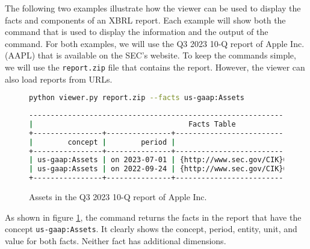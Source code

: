 The following two examples illustrate how the viewer can be used to display the facts and components of an XBRL report.
Each example will show both the command that is used to display the information and the output of the command.
For both examples, we will use the Q3 2023 10-Q report of Apple Inc. (AAPL) that is available on the SEC's website\cite{aapl_10q_2023_q3}.
To keep the commands simple, we will use the \texttt{report.zip} file that contains the report.
However, the viewer can also load reports from URLs.

\begin{figure}[H]
    \centering
    \begin{lstlisting}[language=bash]
python viewer.py report.zip --facts us-gaap:Assets
\end{lstlisting}
    \begin{lstlisting}[language=bash, basicstyle=\scriptsize\ttfamily]
--------------------------------------------------------------------------------------------+
|                                    Facts Table                                            |
+----------------+---------------+------------------------------------+------+--------------+
|        concept |        period |                             entity | unit |        value |
+----------------+---------------+------------------------------------+------+--------------+
| us-gaap:Assets | on 2023-07-01 | {http://www.sec.gov/CIK}0000320193 |  usd | 335038000000 |
| us-gaap:Assets | on 2022-09-24 | {http://www.sec.gov/CIK}0000320193 |  usd | 352755000000 |
+----------------+---------------+------------------------------------+------+--------------+
\end{lstlisting}
    \caption{Assets in the Q3 2023 10-Q report of Apple Inc.}
    \label{fig:aapl_assets}
\end{figure}

As shown in figure \ref{fig:aapl_assets}, the command returns the facts in the report that have the concept \texttt{us-gaap:Assets}.
It clearly shows the concept, period, entity, unit, and value for both facts.
Neither fact has additional dimensions.

